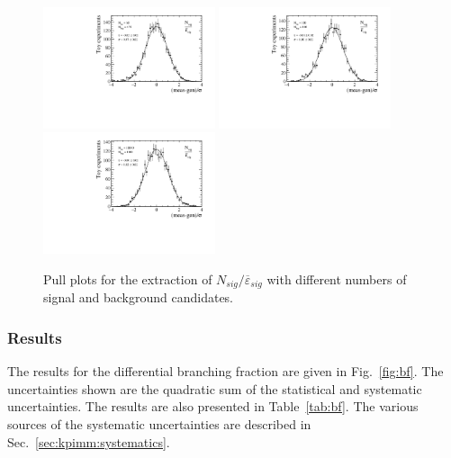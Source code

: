\begin{figure}[!tb]
 \centering
 \includegraphics[width=0.45\textwidth]{figs/kpimm/bf/n_prime_low_yield.pdf}
 \includegraphics[width=0.45\textwidth]{figs/kpimm/bf/n_prime_med_yield.pdf}
 \includegraphics[width=0.45\textwidth]{figs/kpimm/bf/n_prime_high_yield.pdf}
 \caption{Pull plots for the extraction of $N_{sig}/\overline{\varepsilon}_{sig}$ with different numbers of signal and background candidates.}
 \label{fig:bf:pulls}
\end{figure}

\subsubsection{Results}

The results for the differential branching fraction are given in Fig.~\ref{fig:bf}.  The uncertainties shown are the quadratic sum of the statistical and systematic uncertainties.  The results are also presented in Table~\ref{tab:bf}.  The various sources of the systematic uncertainties are described in Sec.~\ref{sec:kpimm:systematics}.
 
